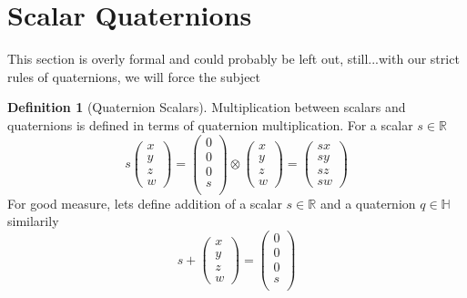 \documentclass{amsart}
\theoremstyle{definition}
\newtheorem{definition}[theorem]{Definition}
\theoremstyle{remark}
\numberwithin{equation}{section}
\begin{document}
\section{Scalar Quaternions}
This section is overly formal and could probably be left out, still...with our strict rules of quaternions, we will force the subject
\begin{definition}[Quaternion Scalars]
  Multiplication between scalars and quaternions is defined in terms of quaternion multiplication. For a scalar $s\in\mathbb{R}$
  \begin{equation}
    s
    \begin{pmatrix}
      x \\
      y \\
      z \\
      w
    \end{pmatrix} =
    \begin{pmatrix}
      0 \\
      0 \\
      0 \\
      s \\
    \end{pmatrix}
    \otimes 
    \begin{pmatrix}
      x \\
      y \\
      z \\
      w
    \end{pmatrix} = 
    \begin{pmatrix}
      sx \\
      sy \\
      sz \\
      sw
    \end{pmatrix}
  \end{equation}
  For good measure, lets define addition of a scalar $s\in\mathbb{R}$ and a quaternion $q\in\mathbb{H}$ similarily
  \begin{equation}
    s+
    \begin{pmatrix}
      x \\
      y \\
      z \\
      w
    \end{pmatrix} =
    \begin{pmatrix}
      0 \\
      0 \\
      0 \\
      s \\
    \end{pmatrix}

\end{equation}
\end{definition}
\end{document}
